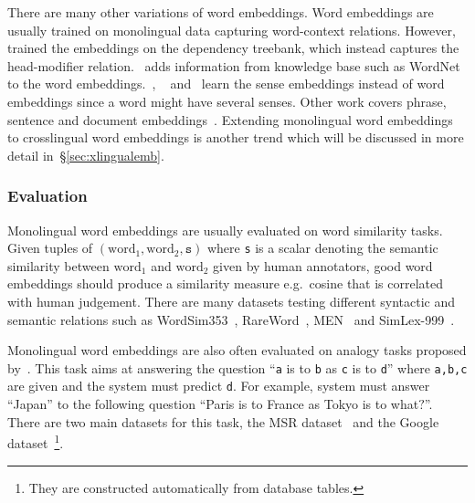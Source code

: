\documentclass[12pt,twoside,final,hidelinks]{ltthesis}
\theoremstyle{definition}
\begin{document}
There are many other variations of word embeddings. Word embeddings are usually trained on monolingual data capturing word-context relations. 
However,~ trained the embeddings on the dependency treebank, which instead captures the head-modifier 
relation.~ adds information from knowledge base such as WordNet~\cite{Miller:1995:WLD:219717.219748} to the word 
embeddings.~, ~ and~ learn the sense 
embeddings instead of word embeddings since a word might have several senses. Other work covers phrase, sentence and document 
embeddings~\cite{DBLP:journals/corr/KirosZSZTUF15,DBLP:journals/corr/TaiSM15,kalchbrenner-grefenstette-blunsom:2014:P14-1,DBLP:conf/icml/LeM14}. Extending monolingual word embeddings to crosslingual word embeddings is another trend which will be discussed in more detail in~\S\ref{sec:xlingualemb}.
	
\subsubsection{Evaluation}
Monolingual word embeddings are usually evaluated on word similarity tasks. Given tuples of $(\text{word}_1,\text{word}_2,\texttt{s})$ where \texttt{s} is a scalar denoting the semantic similarity between $\text{word}_1$ and $\text{word}_2$ given by human annotators,  good word embeddings should produce a similarity measure e.g.\ cosine that is correlated with human judgement. There are many datasets testing different syntactic and semantic relations such as WordSim353~\cite{ws353}, RareWord~\cite{Luong-etal:naacl15:bivec}, MEN~\cite{DBLP:conf/acl/BruniBBT12} and SimLex-999~\cite{DBLP:journals/coling/HillRK15}. 

Monolingual word embeddings are also often evaluated on analogy tasks proposed by~. This task aims at answering the question ``\texttt{a} is to \texttt{b} as \texttt{c} is to \texttt{d}'' where \texttt{a,b,c} are given and the system must predict \texttt{d}. For example, system must answer ``Japan'' to the following question ``Paris is to France as Tokyo is to what$?$''. There are two main datasets for this task, the MSR dataset~\cite{mikolov-yih-zweig:2013:NAACL-HLT} and the Google dataset~\cite{DBLP:journals/corr/abs-1301-3781}\footnote{They are constructed automatically from database tables.}. 
\end{document}
